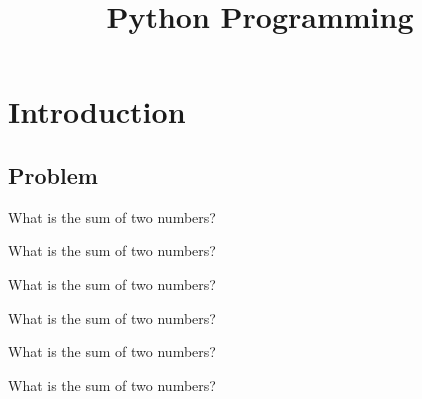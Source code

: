 \documentclass[aspectratio=1610,slidestop]{beamer}
\author{}
\title{Python Programming}
\begin{document}

\section{Introduction}

\subsection{Problem}
\begin{pframe}
What is the sum of two numbers?
\end{pframe}

\begin{pframe}
\addtocounter{framenumber}{-1}
What is the sum of two numbers?
 \begin{center}
   
 \end{center}
\end{pframe}

\begin{pframe}
\addtocounter{framenumber}{-1}
What is the sum of two numbers?
 \begin{center}
   
 \end{center}
\end{pframe}

\begin{pframe}
\addtocounter{framenumber}{-1}
What is the sum of two numbers?
 \begin{center}
   
 \end{center}
\end{pframe}

\begin{pframe}
\addtocounter{framenumber}{-1}
What is the sum of two numbers?
 \begin{center}
   
 \end{center}
\end{pframe}

\begin{pframe}
\addtocounter{framenumber}{-1}
What is the sum of two numbers?
 \begin{center}
   
 \end{center}
\end{pframe}
\end{document}
